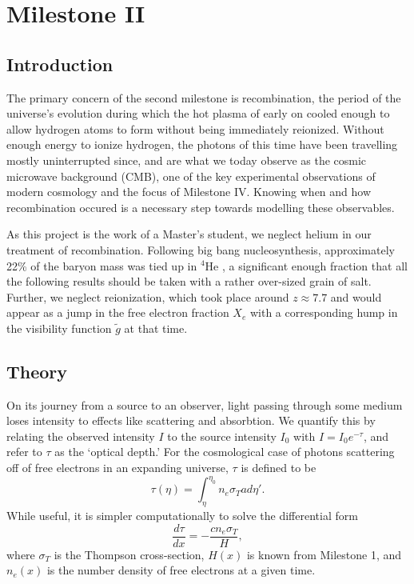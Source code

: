\documentclass[aps,prl,twocolumn,groupedaddress,nofootinbib]{revtex4-2}
\begin{document}
\section{Milestone II}
\subsection{Introduction}
The primary concern of the second milestone is recombination, the period of the universe's evolution during which the hot plasma of early on cooled enough to allow hydrogen atoms to form without being immediately reionized. Without enough energy to ionize hydrogen, the photons of this time have been travelling mostly uninterrupted since, and are what we today observe as the cosmic microwave background (CMB), one of the key experimental observations of modern cosmology and the focus of Milestone IV. Knowing when and how recombination occured is a necessary step towards modelling these observables.

As this project is the work of a Master's student, we neglect helium in our treatment of recombination. Following big bang nucleosynthesis, approximately 22\% of the baryon mass was tied up in $^4$He \cite{Dodelson_Schmidt_2026}, a significant enough fraction that all the following results should be taken with a rather over-sized grain of salt. Further, we neglect reionization, which took place around $z\approx7.7$ \cite{aghanim_planck_2020} and would appear as a jump in the free electron fraction $X_e$ with a corresponding hump in the visibility function $\tilde g$ at that time.

\subsection{Theory}
On its journey from a source to an observer, light passing through some medium loses intensity to effects like scattering and absorbtion. We quantify this by relating the observed intensity $I$ to the source intensity $I_0$ with $I=I_0e^{-\tau}$, and refer to $\tau$ as the `optical depth.' For the cosmological case of photons scattering off of free electrons in an expanding universe, $\tau$ is defined to be
\begin{equation}
    \tau(\eta) = \int_{\eta}^{\eta_0} n_e \sigma_T a d\eta'.
\end{equation}
While useful, it is simpler computationally to solve the differential form
\begin{equation}
    \frac{d\tau}{dx} = -\frac{c n_e \sigma_T }{H},
    \label{eq:tau}
\end{equation}
where $\sigma_T$ is the Thompson cross-section, $H(x)$ is known from Milestone 1, and $n_e(x)$ is the number density of free electrons at a given time.
\end{document}

